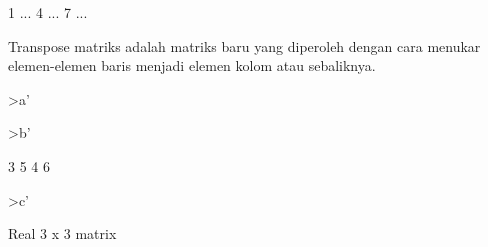 \documentclass[a4paper,10pt]{article}
\begin{document}
\begin{eulernotebook}
\begin{eulercomment}
\begin{eulercomment}
\begin{eulercomment}
\begin{eulercomment}
\begin{euleroutput}
                        1     ...
                        4     ...
                        7     ...
\end{euleroutput}
\begin{eulercomment}
Transpose matriks adalah matriks baru yang diperoleh dengan cara
menukar elemen-elemen baris menjadi elemen kolom atau sebaliknya.
\end{eulercomment}
\begin{eulerprompt}
>a'
\end{eulerprompt}
\begin{euleroutput}
  [1,  2]
\end{euleroutput}
\begin{eulerprompt}
>b'
\end{eulerprompt}
\begin{euleroutput}
                        3                       5 
                        4                       6 
\end{euleroutput}
\begin{eulerprompt}
>c'
\end{eulerprompt}
\begin{euleroutput}
  Real 3 x 3 matrix
  

\end{euleroutput}
\end{eulercomment}
\end{eulercomment}
\end{eulercomment}
\end{eulercomment}
\end{eulernotebook}
\end{document}
